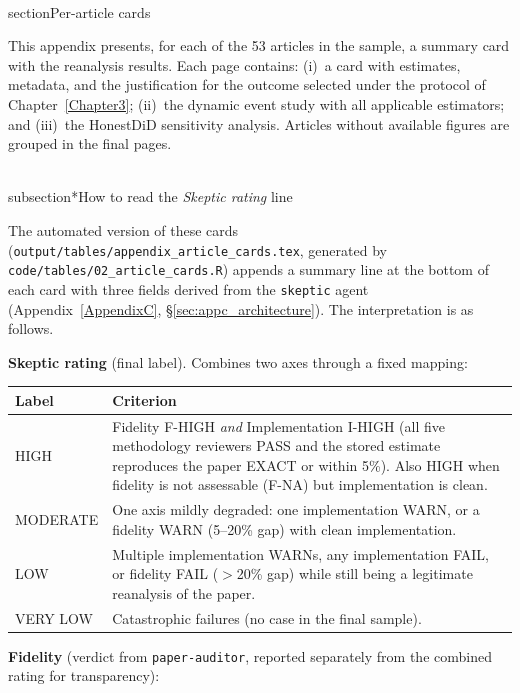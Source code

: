 \\section{Per-article cards}
\label{AppendixB}

This appendix presents, for each of the 53 articles in the sample, a summary card with the reanalysis results. Each page contains: (i)~a card with estimates, metadata, and the justification for the outcome selected under the protocol of Chapter~\ref{Chapter3}; (ii)~the dynamic event study with all applicable estimators; and (iii)~the HonestDiD sensitivity analysis. Articles without available figures are grouped in the final pages.

\\subsection*{How to read the \emph{Skeptic rating} line}

The automated version of these cards (\texttt{output/tables/appendix\_article\_cards.tex}, generated by \texttt{code/tables/02\_article\_cards.R}) appends a summary line at the bottom of each card with three fields derived from the \texttt{skeptic} agent (Appendix~\ref{AppendixC}, §\ref{sec:appc_architecture}). The interpretation is as follows.

\noindent\textbf{Skeptic rating} (final label). Combines two axes through a fixed mapping:

\begin{table}[H]
\centering
\footnotesize
\begin{tabularx}{\textwidth}{@{}l X@{}}
\toprule
\textbf{Label} & \textbf{Criterion} \\
\midrule
HIGH     & Fidelity F-HIGH \emph{and} Implementation I-HIGH (all five methodology reviewers PASS and the stored estimate reproduces the paper EXACT or within 5\%). Also HIGH when fidelity is not assessable (F-NA) but implementation is clean. \\
MODERATE & One axis mildly degraded: one implementation WARN, or a fidelity WARN (5--20\% gap) with clean implementation. \\
LOW      & Multiple implementation WARNs, any implementation FAIL, or fidelity FAIL ($>$20\% gap) while still being a legitimate reanalysis of the paper. \\
VERY LOW & Catastrophic failures (no case in the final sample). \\
\bottomrule
\end{tabularx}
\end{table}

\noindent\textbf{Fidelity} (verdict from \texttt{paper-auditor}, reported separately from the combined rating for transparency):

